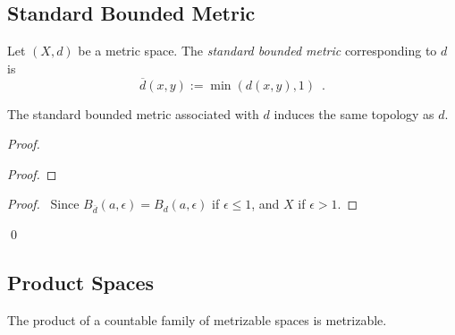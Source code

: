 \subsection{Standard Bounded Metric}

\begin{df}
Let $(X,d)$ be a metric space. The \emph{standard bounded metric} corresponding to $d$ is
\[ \overline{d}(x,y) := \min(d(x,y),1) \enspace . \]
\end{df}

\begin{prop}
The standard bounded metric associated with $d$ induces the same topology as $d$.
\end{prop}

\begin{proof}
\pf
{}
\begin{proof}
\end{proof}
\begin{proof}
	\pf\ Since $B_{\overline{d}}(a, \epsilon) = B_d(a, \epsilon)$ if $\epsilon \leq 1$, and $X$ if $\epsilon > 1$.
\end{proof}
\qed
\end{proof}

\subsection{Product Spaces}

\begin{prop}
The product of a countable family of metrizable spaces is metrizable.
\end{prop}

